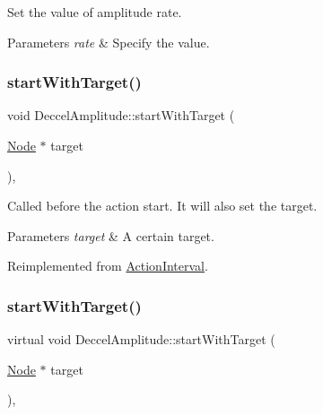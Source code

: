 Set the value of amplitude rate. 


\begin{DoxyParams}{Parameters}
{\em rate} & Specify the value. \\
\hline
\end{DoxyParams}
\mbox{\label{classDeccelAmplitude_a130c290651e4e5809bfc4f670825e30d}} 
\subsubsection{\texorpdfstring{start\+With\+Target()}{startWithTarget()}\hspace{0.1cm}{\footnotesize\ttfamily [1/2]}}
{\footnotesize\ttfamily void Deccel\+Amplitude\+::start\+With\+Target (\begin{DoxyParamCaption}\item[{\hyperlink{classNode}{Node} $\ast$}]{target }\end{DoxyParamCaption})\hspace{0.3cm}{\ttfamily [override]}, {\ttfamily [virtual]}}

Called before the action start. It will also set the target.


\begin{DoxyParams}{Parameters}
{\em target} & A certain target. \\
\hline
\end{DoxyParams}


Reimplemented from \hyperlink{classActionInterval_ad3d91186b2c3108488ddbbdbbd982484}{Action\+Interval}.

\mbox{\label{classDeccelAmplitude_a6926155c154880f8a1f6c4ad6336c446}} 
\subsubsection{\texorpdfstring{start\+With\+Target()}{startWithTarget()}\hspace{0.1cm}{\footnotesize\ttfamily [2/2]}}
{\footnotesize\ttfamily virtual void Deccel\+Amplitude\+::start\+With\+Target (\begin{DoxyParamCaption}\item[{\hyperlink{classNode}{Node} $\ast$}]{target }\end{DoxyParamCaption})\hspace{0.3cm}{\ttfamily [override]}, {\ttfamily [virtual]}}

